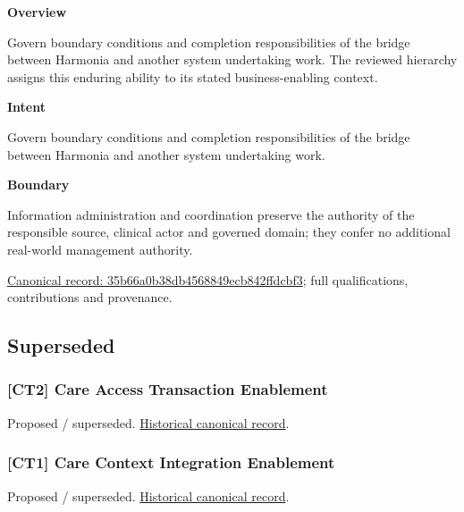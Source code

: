 \textbf{Overview}



Govern boundary conditions and completion responsibilities of the bridge between Harmonia and another system undertaking work. The reviewed hierarchy assigns this enduring ability to its stated business-enabling context.



\textbf{Intent}



Govern boundary conditions and completion responsibilities of the bridge between Harmonia and another system undertaking work.



\textbf{Boundary}



Information administration and coordination preserve the authority of the responsible source, clinical actor and governed domain; they confer no additional real-world management authority.


{\footnotesize \href{../../../../continuum/strategy/capability/35b66a0b38db4568849ecb842ffdcbf3.md}{Canonical record: 35b66a0b38db4568849ecb842ffdcbf3}; full qualifications, contributions and provenance.}\par
\subsection{Superseded}

\subsubsection{[CT2] Care Access Transaction Enablement}

\par\label{element:b65973b576154d3a96cf458bf33df53a}
Proposed / superseded. \href{../../../../continuum/strategy/capability/b65973b576154d3a96cf458bf33df53a.md}{Historical canonical record}.\par

\subsubsection{[CT1] Care Context Integration Enablement}

\par\label{element:a84a7e96e7874a4b87d18c53b1b5cf29}
Proposed / superseded. \href{../../../../continuum/strategy/capability/a84a7e96e7874a4b87d18c53b1b5cf29.md}{Historical canonical record}.\par

